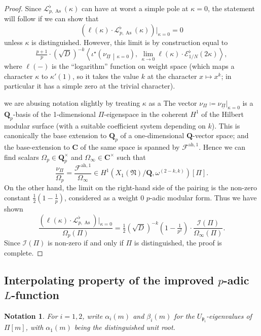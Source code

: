 \documentclass[a4paper,10pt]{amsart}
\theoremstyle{plain}
\newtheorem{notation}[theorem]{Notation}
\theoremstyle{remark}
\newcommand{\ah}{\mathrm{ah}}
\DeclareMathOperator{\As}{As}
\newcommand{\CC}{\mathbf{C}}
\newcommand{\QQ}{\mathbf{Q}}
\newcommand{\Qp}{\QQ_p}
\newcommand{\cE}{\mathcal{E}}
\newcommand{\cF}{\mathcal{F}}
\newcommand{\cL}{\mathcal{L}}
\newcommand{\pp}{\mathfrak{p}}
\numberwithin{equation}{section}
\begin{document}
 \begin{proof}
  Since  $\cL^\flat_{p,\As}(\kappa)$ can have at worst a simple pole at $\kappa=0$, the statement will follow if we can show that
  \[ \left(\ell(\kappa) \cdot \cL^\flat_{p,\As}(\kappa)\right)|_{\kappa=0}=0\]
  unless $\kappa$ is distinguished. However, this limit is by construction equal to
  \[
   \tfrac{p + 1}{p} \cdot (\sqrt{D})^{-k} \left\langle \iota^\star\left(\nu_{\underline{\Pi}}\middle|_{\kappa = 0}\right),\,
   \lim_{\kappa \to 0} \ell(\kappa) \cdot \cE^{\flat}_{1/N}(2\kappa) \right\rangle, \]
  where $\ell(-)$ is the ``logarithm'' function on weight space (which maps a character $\kappa$ to $\kappa'(1)$, so it takes the value $k$ at the character $x \mapsto x^k$; in particular it has a simple zero at the trivial character).
  
  
  we are abusing notation slightly by treating $\kappa$ as a 
  The vector $\nu_\Pi \coloneqq \nu_{\underline{\Pi}}|_{\kappa = 0}$ is a $\Qp$-basis of the 1-dimensional $\Pi$-eigenspace in the coherent $H^1$ of the Hilbert modular surface (with a suitable coefficient system depending on $k$). This is canonically the base extension to $\Qp$ of a one-dimensional $\QQ$-vector space; and the base-extension to $\CC$ of the same space is spanned by $\cF^{\ah, 1}$. Hence we can find scalars $\Omega_p \in \Qp^\times$ and $\Omega_\infty \in \CC^\times$ such that
  \[
   \frac{\nu_\Pi}{\Omega_p} = \frac{\cF^{\mathrm{ah}, 1}}{\Omega_\infty} \in H^1(X_1(\mathfrak{N}) / \QQ, \omega^{(2-k, k)})[\Pi].
  \]
  On the other hand, the limit on the right-hand side of the pairing is the non-zero constant $\tfrac{1}{2}\left(1 - \tfrac{1}{p}\right)$, considered as a weight 0 $p$-adic modular form. Thus we have shown
  \[ \frac{\left(\ell(\kappa) \cdot \cL^\flat_{p,\As}\right)|_{\kappa=0}}{\Omega_p(\Pi)} = \tfrac{1}{2} (\sqrt{D})^{-k} \left(1 - \tfrac{1}{p^2}\right)\cdot \frac{\mathcal{I}(\Pi)}{\Omega_\infty(\Pi)}. \]
  Since $\mathcal{I}(\Pi)$ is non-zero if and only if $\Pi$ is distinguished, the proof is complete.
 \end{proof}

 \subsection{Interpolating property of the improved $p$-adic $L$-function}

  \begin{notation}
  	For $i=1,2$, write $\alpha_i(m)$ and $\beta_i(m)$ for the $U_{\pp_i}$-eigenvalues of $\Pi[m]$, with $\alpha_1(m)$ being the distinguished unit root.
  \end{notation}
\end{document}
